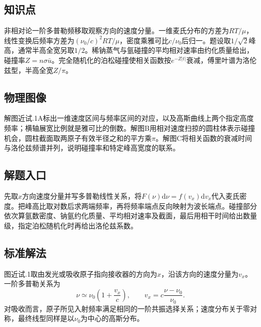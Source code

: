\documentclass[UTF8,fontset=fandol,a4paper,11pt]{ctexart}
\begin{document}


\subsection*{知识点}

非相对论一阶多普勒频移取观察方向的速度分量。一维麦氏分布的方差为$RT/\mu$，线性变换后频率方差为$(\nu_0/c)^2RT/\mu$，密度乘雅可比$c/\nu_0$后归一。题设取$1/\sqrt2$峰高，通常半高全宽另取$1/2$。稀钠蒸气与氩碰撞的平均相对速率由约化质量给出，碰撞率$Z=n\sigma\bar u$。完全随机化的泊松碰撞使相关函数按$e^{-Z|t|}$衰减，傅里叶谱为洛伦兹型，半高全宽$Z/\pi$。



\subsection*{物理图像}

解图近试.1A标出一维速度区间与频率区间的对应，以及高斯曲线上两个指定高度频率；横轴展宽比例就是雅可比的倒数。解图B用相对速度扫掠的圆柱体表示碰撞机会，圆柱截面取两原子有效半径之和的平方乘$\pi$。解图C将相关函数的衰减时间与洛伦兹频谱并列，说明碰撞率和特定峰高宽度的联系。



\subsection*{解题入口}

先取$x$方向速度分量并写多普勒线性关系，将$F(\nu)\mathrm d\nu=f(v_x)\mathrm dv_x$代入麦氏密度。把峰高比取对数后求两端频率，再将频率端点反向映射为波长端点。碰撞部分依次算氩数密度、钠氩约化质量、平均相对速率及截面，最后用相干时间给出数量级，指定泊松随机化时再给出洛伦兹系数。



\subsection*{标准解法}


图近试.1取由发光或吸收原子指向接收器的方向为$x$，沿该方向的速度分量为$v_x$。一阶多普勒关系为
\[
\nu\simeq\nu_0\left(1+\frac{v_x}{c}\right),
\qquad v_x=c\frac{\nu-\nu_0}{\nu_0}.
\]
对吸收而言，原子所见入射频率满足相同的一阶共振选择关系；速度分布关于零对称，最终线型同样是以$\nu_0$为中心的高斯分布。
\end{document}
